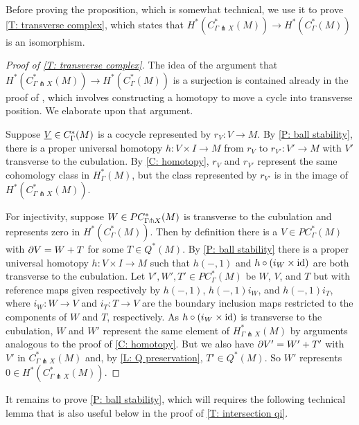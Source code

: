 Before proving the proposition, which is somewhat technical, we use it to prove \cref{T: transverse complex}, which states that $H^*(C^*_{\Gamma \pitchfork X}(M)) \to H^*(C_\Gamma^*(M))$ is an isomorphism.



\begin{proof}[Proof of \cref{T: transverse complex}]
	The idea of the argument that $H^*(C^*_{\Gamma \pitchfork X}(M)) \to H^*(C_\Gamma^*(M))$ is a surjection is contained already in the proof of \cite[Lemma 15]{Lipy14}, which involves constructing a homotopy to move a cycle into transverse position.
	We elaborate upon that argument.
	
Suppose $\underline{V}\in C_\Gamma^*(M)$ is a cocycle represented by $r_V:V\to M$. By \cref{P: ball stability}, there is a proper universal homotopy $h: V\times I\to M$ from $r_V$ to $r_{V'}:V'\to M$ with $V'$ transverse to the cubulation.  
By \cref{C: homotopy}, $r_V$ and $r_{V'}$ represent the same cohomology class in $H^*_{\Gamma}(M)$, but the class represented by $r_{V'}$ is in the image of $H^*(C^*_{\Gamma \pitchfork X}(M))$.


For injectivity, suppose  $W\in PC^*_{\Gamma\pitchfork X}(M)$ is transverse to the cubulation and represents zero in $H^*(C_\Gamma^*(M))$. Then by definition there is a $V\in PC^*_\Gamma(M)$ with $\partial V=W+T$ for some
	$T \in Q^*(M)$. 
By \cref{P: ball stability} there is a proper universal homotopy $h:V\times I\to M$ such that $h(-,1)$  and $h\circ(i_{W}\times \mathrm{id})$ are both transverse to the cubulation.
Let $V', W',T'\in PC^*_\Gamma(M)$ be $W$, $V$, and $T$ but with reference maps given respectively by $h(-,1)$, $h(-,1)i_W$, and $h(-,1)i_T$, where $i_W:W\to V$ and $i_T:T\to V$ are the boundary inclusion maps restricted to the components of $W$ and $T$, respectively. 
As $h\circ(i_{W}\times \mathrm{id})$ is transverse to the cubulation,  $W$ and $W'$ represent the same element of $H^*_{\Gamma \pitchfork X}(M)$ by arguments analogous to the proof of \cref{C: homotopy}.
But we also have $\partial V'=W'+T'$ with $V'$ in $C^*_{\Gamma \pitchfork X}(M)$ and, by \cref{L: Q preservation},   $T'\in Q^*(M)$. So $W'$ represents $0\in H^*(C^*_{\Gamma \pitchfork X}(M))$. 
\end{proof}

It remains to prove \cref{P: ball stability}, which will requires the following technical lemma that is also useful below in the proof of \cref{T: intersection qi}. 

